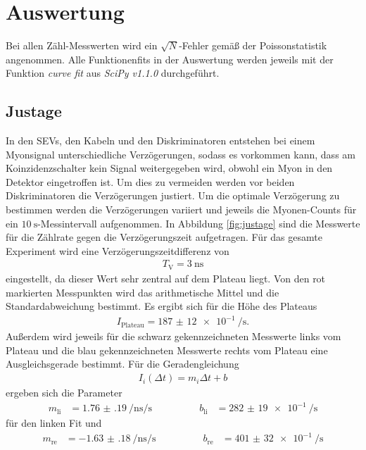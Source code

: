 \section{Auswertung}
\label{sec:Auswertung}

Bei allen Zähl-Messwerten wird ein $\sqrt{N}$-Fehler gemäß der Poissonstatistik angenommen.
Alle Funktionenfits in der Auswertung werden jeweils mit der Funktion \textit{curve fit} aus \textit{SciPy v1.1.0} durchgeführt.

\subsection{Justage}

In den SEVs, den Kabeln und den Diskriminatoren entstehen bei einem Myonsignal unterschiedliche Verzögerungen, sodass es vorkommen kann, dass
am Koinzidenzschalter kein Signal weitergegeben wird, obwohl ein Myon in den Detektor eingetroffen ist. Um dies zu vermeiden werden
vor beiden Diskriminatoren die Verzögerungen justiert. Um die optimale Verzögerung zu bestimmen werden die Verzögerungen variiert und jeweils die Myonen-Counts für ein
$\SI{10}{\second}$-Messintervall aufgenommen. In Abbildung \ref{fig:justage} sind die Messwerte für die Zählrate
gegen die Verzögerungszeit aufgetragen. Für das gesamte Experiment wird eine Verzögerungszeitdifferenz von
\begin{align*}
  T_\text{V} = \SI{3}{\nano\second}
\end{align*}
eingestellt, da dieser Wert sehr zentral auf dem Plateau liegt. Von den rot markierten Messpunkten wird das arithmetische
Mittel und die Standardabweichung bestimmt. Es ergibt sich für die Höhe des Plateaus
\begin{align}
  I_\text{Plateau} = \SI{187(12)e-1}{\per\second}.
\end{align}
Außerdem wird jeweils für die schwarz gekennzeichneten Messwerte links vom Plateau und die blau gekennzeichneten Messwerte
rechts vom Plateau eine Ausgleichsgerade bestimmt. Für die Geradengleichung
\begin{align}
  I_i(\Delta t) = m_i \Delta t + b
\end{align}
ergeben sich die Parameter
\begin{align}
  m_\text{li} &= \SI{1.76(19)}{\per\nano\second\per\second} \qquad \qquad &b_\text{li} &= \SI{282(19)e-1}{\per\second}
\end{align}
für den linken Fit und
\begin{align}
  m_\text{re} &= \SI{-1.63(18)}{\per\nano\second\per\second} \qquad \qquad &b_\text{re} &= \SI{401(32)e-1}{\per\second}
\end{align}
